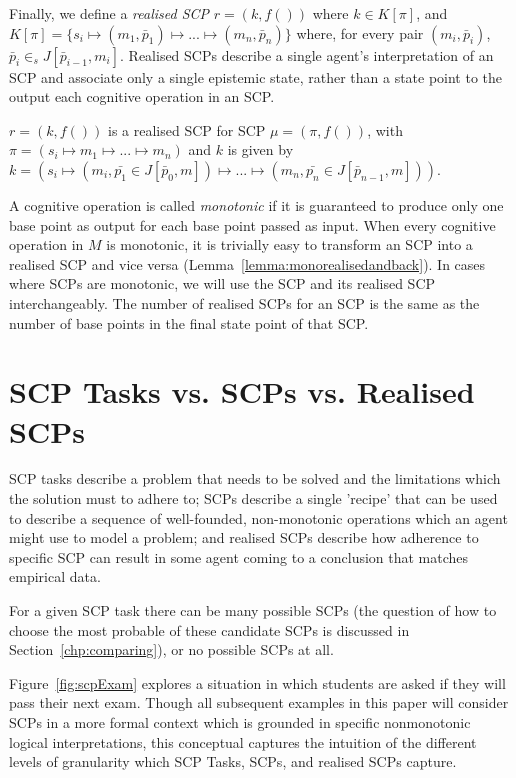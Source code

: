 Finally, we define a \textit{realised SCP} $r = (k, f())$ where $k \in K[\pi]$, and $K[\pi]=\{s_i \longmapsto (m_1,\bar{p}_1) \longmapsto ... \longmapsto (m_n,\bar{p}_n)\}$ where, for every pair $(m_i,\bar{p}_i)$, $\bar{p}_i \in_s J[\bar{p}_{i-1},m_i]$. Realised SCPs describe a single agent's interpretation of an SCP and associate only a single epistemic state, rather than a state point to the output each cognitive operation in an SCP. 

$r=(k, f())$ is a realised SCP for SCP $\mu=(\pi,f())$, with $\pi=(s_i\longmapsto m_1 \longmapsto ...\longmapsto m_n)$ and $k$ is given by $k=(s_i \longmapsto (m_i, \bar{p_1} \in J[\bar{p}_{0},m]) \longmapsto ... \longmapsto (m_n, \bar{p_n} \in J[\bar{p}_{n-1},m]))$.

A cognitive operation is called \textit{monotonic} if it is guaranteed to produce only one base point as output for each base point passed as input. When every cognitive operation in $M$ is monotonic, it is trivially easy to transform an SCP into a realised SCP and vice versa (Lemma~\ref{lemma:monorealisedandback}). In cases where SCPs are monotonic, we will use the SCP and its realised SCP interchangeably. The number of realised SCPs for an SCP is the same as the number of base points in the final state point of that SCP.



\section{SCP Tasks vs. SCPs vs. Realised SCPs}

SCP tasks describe a problem that needs to be solved and the limitations which the solution must to adhere to; SCPs describe a single 'recipe' that can be used to describe a sequence of well-founded, non-monotonic operations which an agent might use to model a problem; and realised SCPs describe how adherence to specific SCP can result in some agent coming to a conclusion that matches empirical data.

For a given SCP task there can be many possible SCPs (the question of how to choose the most probable of these candidate SCPs is discussed in Section~\ref{chp:comparing}), or no possible SCPs at all.

Figure~\ref{fig:scpExam} explores a situation in which students are asked if they will pass their next exam. Though all subsequent examples in this paper will consider SCPs in a more formal context which is grounded in specific nonmonotonic logical interpretations, this conceptual captures the intuition of the different levels of granularity which SCP Tasks, SCPs, and realised SCPs capture. 

